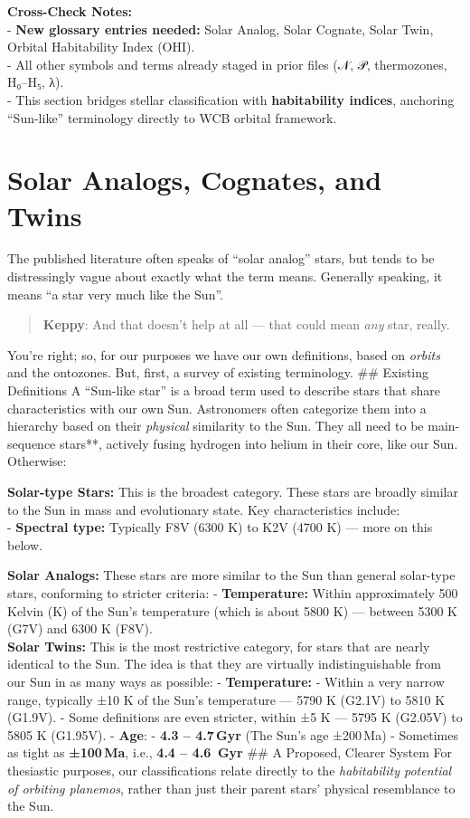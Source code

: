 \documentclass[
  letterpaper,
]{book}
\begin{document}
\textbf{Cross-Check Notes:}\\
- \textbf{New glossary entries needed:} Solar Analog, Solar Cognate,
Solar Twin, Orbital Habitability Index (OHI).\\
- All other symbols and terms already staged in prior files (𝒩, 𝒫,
thermozones, H₀--H₅, λ).\\
- This section bridges stellar classification with \textbf{habitability
indices}, anchoring ``Sun-like'' terminology directly to WCB orbital
framework.

\chapter{Solar Analogs, Cognates, and
Twins}\label{solar-analogs-cognates-and-twins}

The published literature often speaks of ``solar analog'' stars, but
tends to be distressingly vague about exactly what the term means.
Generally speaking, it means ``a star very much like the Sun''.

\begin{quote}
\textbf{Keppy}: And that doesn't help at all --- that could mean
\emph{any} star, really.
\end{quote}

You're right; so, for our purposes we have our own definitions, based on
\emph{orbits} and the ontozones. But, first, a survey of existing
terminology. \#\# Existing Definitions A ``Sun-like star'' is a broad
term used to describe stars that share characteristics with our own Sun.
Astronomers often categorize them into a hierarchy based on their
\emph{physical} similarity to the Sun. They all need to be main-sequence
stars**, actively fusing hydrogen into helium in their core, like our
Sun. Otherwise:

\textbf{Solar-type Stars:} This is the broadest category. These stars
are broadly similar to the Sun in mass and evolutionary state. Key
characteristics include:\\
- \textbf{Spectral type:} Typically F8V (6300 K) to K2V (4700 K) ---
more on this below.

\textbf{Solar Analogs:} These stars are more similar to the Sun than
general solar-type stars, conforming to stricter criteria: -
\textbf{Temperature:} Within approximately 500 Kelvin (K) of the Sun's
temperature (which is about 5800 K) --- between 5300 K (G7V) and 6300 K
(F8V).\\
\textbf{Solar Twins:} This is the most restrictive category, for stars
that are nearly identical to the Sun. The idea is that they are
virtually indistinguishable from our Sun in as many ways as possible: -
\textbf{Temperature:} - Within a very narrow range, typically ±10 K of
the Sun's temperature --- 5790 K (G2.1V) to 5810 K (G1.9V). - Some
definitions are even stricter, within ±5 K --- 5795 K (G2.05V) to 5805 K
(G1.95V). - \textbf{Age}: - \textbf{4.3 -- 4.7\,Gyr} (The Sun's age
±200\,Ma) - Sometimes as tight as \textbf{±100\,Ma}, i.e., \textbf{4.4
-- 4.6 \,Gyr} \#\# A Proposed, Clearer System For thesiastic purposes,
our classifications relate directly to the \emph{habitability potential
of orbiting planemos}, rather than just their parent stars' physical
resemblance to the Sun.
\end{document}
